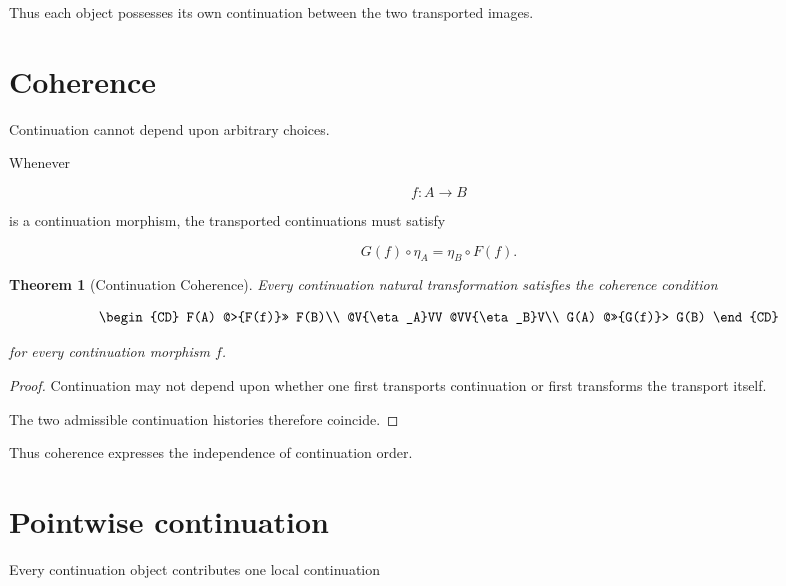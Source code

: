 \documentclass[13pt,openany]{book}
\theoremstyle{plain}
\newtheorem{theorem}{Theorem}[chapter]
\theoremstyle{definition}
\begin{document}
Thus each object possesses its own continuation between the two transported
images.

\section{Coherence}

Continuation cannot depend upon arbitrary choices.

Whenever

\[
f:A\rightarrow B
\]

is a continuation morphism, the transported continuations must satisfy

\[
G(f)\circ\eta_A
=
\eta_B\circ F(f).
\]

\begin{theorem}[Continuation Coherence]

Every continuation natural transformation satisfies the coherence condition

\[
\begin{CD}
F(A) @>{F(f)}>> F(B)\\
@V{\eta_A}VV @VV{\eta_B}V\\
G(A) @>>{G(f)}> G(B)
\end{CD}
\]

for every continuation morphism \(f\).

\end{theorem}

\begin{proof}

Continuation may not depend upon whether one first transports continuation or
first transforms the transport itself.

The two admissible continuation histories therefore coincide.

\end{proof}

Thus coherence expresses the independence of continuation order.

\section{Pointwise continuation}

Every continuation object contributes one local continuation
\end{document}
